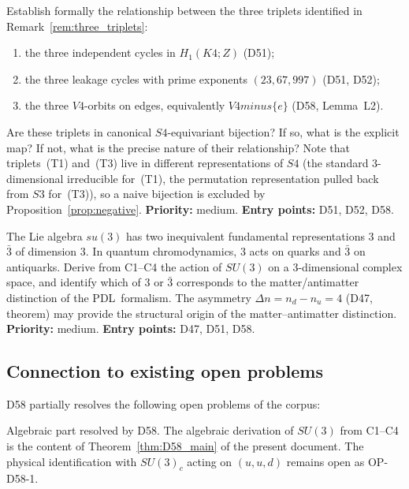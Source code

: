 \documentclass[11pt,a4paper]{article}
\def\Sfour{S4}%
\def\Vfour{V4}%
\def\Sthree{S3}%
\def\SUthree{SU(3)}%
\def\Kfour{K4}%
\def\PDL{PDL}%
\def\setminus{ minus }%
\def\ZZ{Z}%
\def\suthree{su(3)}%
\def\mathbb#1{#1}%
\def\mathrm#1{#1}%
\def\mathfrak#1{#1}%
\def\mathbf#1{#1}%
\def\textsc#1{#1}%
\theoremstyle{plain}
\theoremstyle{definition}
\theoremstyle{remark}
\newenvironment{openproblem}[1][]{%
  \begin{tcolorbox}[openproblemstyle,title={Open Problem\ifx\relax#1\relax\else: #1\fi}]}{\end{tcolorbox}}
\newenvironment{resolvedproblem}[1][]{%
  \begin{tcolorbox}[resolvedstyle,title={Resolved: #1}]}{\end{tcolorbox}}
\newcommand{\PDL}{\textsc{PDL}}
\newcommand{\Kfour}{K_4}
\newcommand{\Sfour}{S_4}
\newcommand{\Vfour}{V_4}
\newcommand{\Sthree}{S_3}
\newcommand{\SUthree}{\mathrm{SU}(3)}
\newcommand{\suthree}{\mathfrak{su}(3)}
\newcommand{\ZZ}{\mathbb{Z}}
\begin{document}
\begin{openproblem}[OP-D58-2 --- The three triplets associated with $\Kfour$]
\label{op:D58-2}
Establish formally the relationship between the three triplets identified in Remark~\ref{rem:three_triplets}:
\begin{enumerate}[label=(T\arabic*),leftmargin=2em]
\item the three independent cycles in $H_1(\Kfour;\ZZ)$ (D51);
\item the three leakage cycles with prime exponents $(23, 67, 997)$ (D51, D52);
\item the three $\Vfour$-orbits on edges, equivalently $\Vfour \setminus \{e\}$ (D58, Lemma~L2).
\end{enumerate}
Are these triplets in canonical $\Sfour$-equivariant bijection? If so, what is the explicit map? If not, what is the precise nature of their relationship? Note that triplets~(T1) and~(T3) live in different representations of $\Sfour$ (the standard 3-dimensional irreducible for~(T1), the permutation representation pulled back from $\Sthree$ for~(T3)), so a naive bijection is excluded by Proposition~\ref{prop:negative}. \textbf{Priority:} medium. \textbf{Entry points:} D51, D52, D58.
\end{openproblem}

\begin{openproblem}[OP-D58-3 --- Fundamental representation of $\SUthree$ from C1--C4]
\label{op:D58-3}
The Lie algebra $\suthree$ has two inequivalent fundamental representations $\mathbf{3}$ and $\bar{\mathbf{3}}$ of dimension 3. In quantum chromodynamics, $\mathbf{3}$ acts on quarks and $\bar{\mathbf{3}}$ on antiquarks. Derive from C1--C4 the action of $\SUthree$ on a 3-dimensional complex space, and identify which of $\mathbf{3}$ or $\bar{\mathbf{3}}$ corresponds to the matter/antimatter distinction of the \PDL\ formalism. The asymmetry $\Delta n = n_d - n_u = 4$ (D47, theorem) may provide the structural origin of the matter--antimatter distinction. \textbf{Priority:} medium. \textbf{Entry points:} D47, D51, D58.
\end{openproblem}

\subsection{Connection to existing open problems}

D58 partially resolves the following open problems of the corpus:

\begin{resolvedproblem}[OP-D57-3 / OP-SU3 --- $\SUthree$ from the proton hierarchy]
\textcolor{proofblue}{Algebraic part resolved by D58.} The algebraic derivation of $\SUthree$ from C1--C4 is the content of Theorem~\ref{thm:D58_main} of the present document. The physical identification with $\SUthree_{\mathrm{c}}$ acting on $(u,u,d)$ remains open as OP-D58-1.
\end{resolvedproblem}
\end{document}
